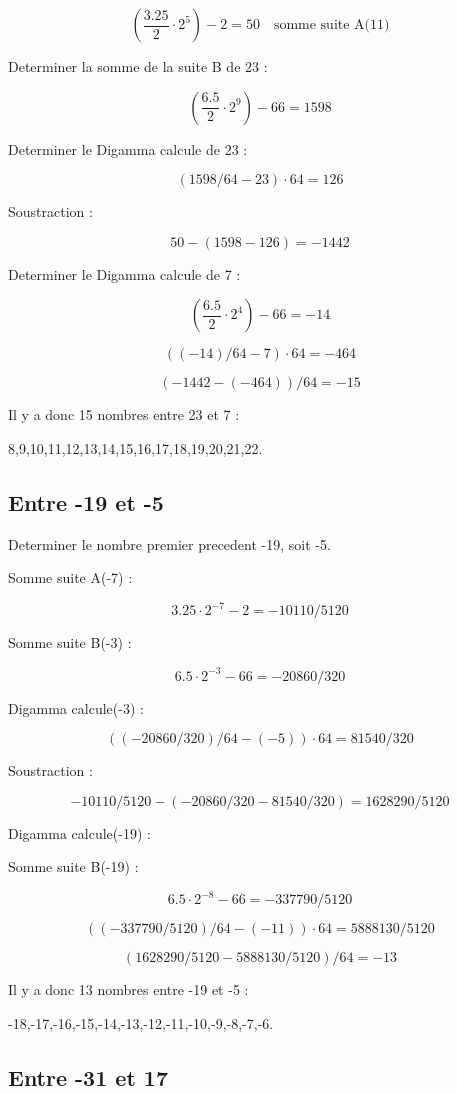 \documentclass[a4paper,11pt]{article}
\begin{document}
\[
\left(\frac{3.25}{2} \cdot 2^{5}\right) - 2 = 50 \quad \text{somme suite A(11)}
\]

Determiner la somme de la suite B de 23 :

\[
\left(\frac{6.5}{2} \cdot 2^{9}\right) - 66 = 1598
\]

Determiner le Digamma calcule de 23 :

\[
(1598/64 - 23) \cdot 64 = 126
\]

Soustraction :

\[
50 - (1598 - 126) = -1442
\]

Determiner le Digamma calcule de 7 :

\[
\left(\frac{6.5}{2} \cdot 2^{4}\right) - 66 = -14
\]

\[
((-14)/64 - 7) \cdot 64 = -464
\]

\[
(-1442 - (-464))/64 = -15
\]

Il y a donc 15 nombres entre 23 et 7 :

8,9,10,11,12,13,14,15,16,17,18,19,20,21,22.

\subsection*{Entre -19 et -5}

Determiner le nombre premier precedent -19, soit -5.

Somme suite A(-7) :

\[
3.25 \cdot 2^{-7} - 2 = -10110/5120
\]

Somme suite B(-3) :

\[
6.5 \cdot 2^{-3} - 66 = -20860/320
\]

Digamma calcule(-3) :

\[
((-20860/320)/64 - (-5)) \cdot 64 = 81540/320
\]

Soustraction :

\[
-10110/5120 - (-20860/320 - 81540/320) = 1628290/5120
\]

Digamma calcule(-19) :

Somme suite B(-19) :

\[
6.5 \cdot 2^{-8} - 66 = -337790/5120
\]

\[
((-337790/5120)/64 - (-11)) \cdot 64 = 5888130/5120
\]

\[
(1628290/5120 - 5888130/5120)/64 = -13
\]

Il y a donc 13 nombres entre -19 et -5 :

-18,-17,-16,-15,-14,-13,-12,-11,-10,-9,-8,-7,-6.

\subsection*{Entre -31 et 17}
\end{document}
